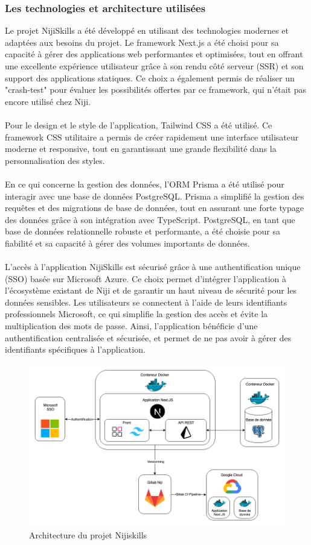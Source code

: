 \documentclass[12pt]{article}
\begin{document}
\subsubsection{Les technologies et architecture utilisées}
Le projet NijiSkills a été développé en utilisant des technologies modernes et adaptées aux besoins du projet. Le framework Next.js a été choisi pour sa capacité à gérer des applications web performantes et optimisées, tout en offrant une excellente expérience utilisateur grâce à son rendu côté serveur (SSR) et son support des applications statiques. Ce choix a également permis de réaliser un "crash-test" pour évaluer les possibilités offertes par ce framework, qui n'était pas encore utilisé chez Niji.
\\\\
Pour le design et le style de l'application, Tailwind CSS a été utilisé. Ce framework CSS utilitaire a permis de créer rapidement une interface utilisateur moderne et responsive, tout en garantissant une grande flexibilité dans la personnalisation des styles.
\\\\
En ce qui concerne la gestion des données, l'ORM Prisma a été utilisé pour interagir avec une base de données PostgreSQL. Prisma a simplifié la gestion des requêtes et des migrations de base de données, tout en assurant une forte typage des données grâce à son intégration avec TypeScript. PostgreSQL, en tant que base de données relationnelle robuste et performante, a été choisie pour sa fiabilité et sa capacité à gérer des volumes importants de données.
\\\\
L'accès à l'application NijiSkills est sécurisé grâce à une authentification unique (SSO) basée sur Microsoft Azure. Ce choix permet d'intégrer l'application à l'écosystème existant de Niji et de garantir un haut niveau de sécurité pour les données sensibles. Les utilisateurs se connectent à l'aide de leurs identifiants professionnels Microsoft, ce qui simplifie la gestion des accès et évite la multiplication des mots de passe. Ainsi, l'application bénéficie d'une authentification centralisée et sécurisée, et permet de ne pas avoir à gérer des identifiants spécifiques à l'application.

\begin{figure}[h!]
    \centering
    \includegraphics[width=0.95\linewidth]{img/archi.png}
    \caption{Architecture du projet Nijiskills}
\end{figure}
\end{document}
